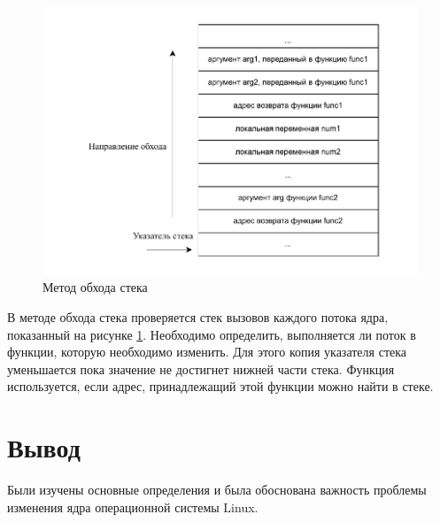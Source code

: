 \begin{figure}[H]
	\begin{center}
		\includegraphics[scale=0.9]{img/call-stack.pdf}
	\end{center}
	\captionsetup{justification=centering}
	\caption{Метод обхода стека}
	\label{img:call-stack}
\end{figure}

В методе обхода стека проверяется стек вызовов каждого потока ядра, показанный на рисунке \ref{img:call-stack}. Необходимо определить, выполняется ли поток в функции, которую необходимо изменить. Для этого копия указателя стека уменьшается пока значение не достигнет нижней части стека. Функция используется, если адрес, принадлежащий этой функции можно найти в стеке.


\section{Вывод}

Были изучены основные определения и была обоснована важность проблемы изменения ядра операционной системы Linux.